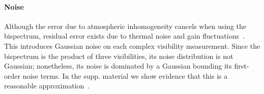 {{\vspace{-0.15in}
\paragraph{Noise} Although the error due to atmospheric inhomogeneity cancels when using the bispectrum, residual error exists due to thermal noise and gain fluctuations~\cite{thompson2008interferometry}. This introduces Gaussian noise on each complex visibility measurement. Since the bispectrum is the product of three visibilities, its noise distribution is not Gaussian; nonetheless, its noise is dominated by a Gaussian bounding its first-order noise terms. In the supp. material we show evidence that this is a reasonable approximation~\cite{suppmaterial}. 





}}
